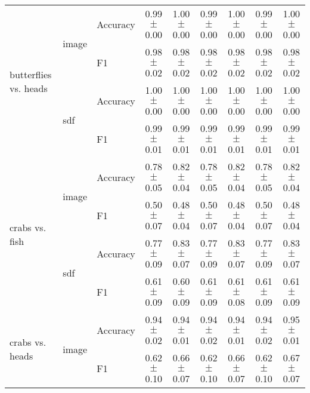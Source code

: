 \documentclass[anon,11pt]{9520} %
\begin{document}
\begin{table}
\begin{center}
\begin{tabular}{l|l|l|cc|cc|cc|}
\multirow{4}{*}{butterflies vs. heads}
& \multirow{2}{*}{image} & \multirow{1}{*}{Accuracy}& 0.99$\pm$0.00& 1.00$\pm$0.00& 0.99$\pm$0.00& 1.00$\pm$0.00& 0.99$\pm$0.00& 1.00$\pm$0.00\\ 
& & \multirow{1}{*}{F1}& 0.98$\pm$0.02& 0.98$\pm$0.02& 0.98$\pm$0.02& 0.98$\pm$0.02& 0.98$\pm$0.02& 0.98$\pm$0.02\\ \cline{2-9} 

& \multirow{2}{*}{sdf} & \multirow{1}{*}{Accuracy}& 1.00$\pm$0.00& 1.00$\pm$0.00& 1.00$\pm$0.00& 1.00$\pm$0.00& 1.00$\pm$0.00& 1.00$\pm$0.00\\ 
& & \multirow{1}{*}{F1}& 0.99$\pm$0.01& 0.99$\pm$0.01& 0.99$\pm$0.01& 0.99$\pm$0.01& 0.99$\pm$0.01& 0.99$\pm$0.01\\ \cline{2-9} 

\multirow{4}{*}{crabs vs. fish}
& \multirow{2}{*}{image} & \multirow{1}{*}{Accuracy}& 0.78$\pm$0.05& 0.82$\pm$0.04& 0.78$\pm$0.05& 0.82$\pm$0.04& 0.78$\pm$0.05& 0.82$\pm$0.04\\ 
& & \multirow{1}{*}{F1}& 0.50$\pm$0.07& 0.48$\pm$0.04& 0.50$\pm$0.07& 0.48$\pm$0.04& 0.50$\pm$0.07& 0.48$\pm$0.04\\ \cline{2-9} 

& \multirow{2}{*}{sdf} & \multirow{1}{*}{Accuracy}& 0.77$\pm$0.09& 0.83$\pm$0.07& 0.77$\pm$0.09& 0.83$\pm$0.07& 0.77$\pm$0.09& 0.83$\pm$0.07\\ 
& & \multirow{1}{*}{F1}& 0.61$\pm$0.09& 0.60$\pm$0.09& 0.61$\pm$0.09& 0.61$\pm$0.08& 0.61$\pm$0.09& 0.61$\pm$0.09\\ \cline{2-9} 

\multirow{4}{*}{crabs vs. heads}
& \multirow{2}{*}{image} & \multirow{1}{*}{Accuracy}& 0.94$\pm$0.02& 0.94$\pm$0.01& 0.94$\pm$0.02& 0.94$\pm$0.01& 0.94$\pm$0.02& 0.95$\pm$0.01\\ 
& & \multirow{1}{*}{F1}& 0.62$\pm$0.10& 0.66$\pm$0.07& 0.62$\pm$0.10& 0.66$\pm$0.07& 0.62$\pm$0.10& 0.67$\pm$0.07\\ \cline{2-9} 


\end{tabular}
\end{center}
\end{table}
\end{document}

